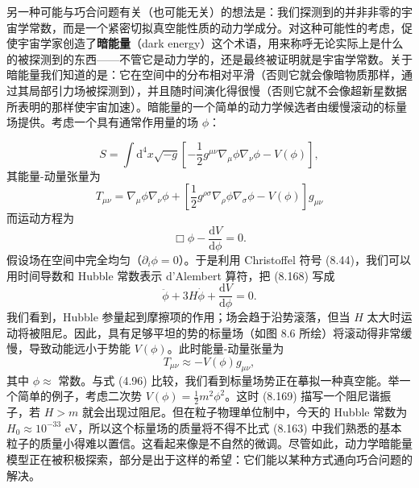 另一种可能与巧合问题有关（也可能无关）的想法是：我们探测到的并非非零的宇宙学常数，而是一个紧密切拟真空能性质的动力学成分。对这种可能性的考虑，促使宇宙学家创造了\textbf{暗能量}（dark energy）这个术语，用来称呼无论实际上是什么的被探测到的东西——不管它是动力学的，还是最终被证明就是宇宙学常数。关于暗能量我们知道的是：它在空间中的分布相对平滑（否则它就会像暗物质那样，通过其局部引力场被探测到），并且随时间演化得很慢（否则它就不会像超新星数据所表明的那样使宇宙加速）。暗能量的一个简单的动力学候选者由缓慢滚动的标量场提供。考虑一个具有通常作用量的场 $\phi$：

\begin{equation*}
S = \int \mathrm{d}^{4}x\sqrt{-g}\left[-\frac{1}{2}g^{\mu\nu}\nabla_{\mu}\phi\nabla_{\nu}\phi - V(\phi)\right],
\tag{8.166}
\end{equation*}
其能量-动量张量为
\begin{equation*}
T_{\mu\nu} = \nabla_{\mu}\phi\nabla_{\nu}\phi + \left[\frac{1}{2}g^{\rho\sigma}\nabla_{\rho}\phi\nabla_{\sigma}\phi - V(\phi)\right]g_{\mu\nu}
\tag{8.167}
\end{equation*}
而运动方程为
\begin{equation*}
\Box\phi - \frac{\mathrm{d}V}{\mathrm{d}\phi} = 0.
\tag{8.168}
\end{equation*}
假设场在空间中完全均匀（$\partial_i\phi=0$）。于是利用 Christoffel 符号 (8.44)，我们可以用时间导数和 Hubble 常数表示 d'Alembert 算符，把 (8.168) 写成
\begin{equation*}
\ddot{\phi} + 3H\dot{\phi} + \frac{\mathrm{d}V}{\mathrm{d}\phi} = 0.
\tag{8.169}
\end{equation*}
我们看到，Hubble 参量起到摩擦项的作用；场会趋于沿势滚落，但当 $H$ 太大时运动将被阻尼。因此，具有足够平坦的势的标量场（如图 8.6 所绘）将滚动得非常缓慢，导致动能远小于势能 $V(\phi)$。此时能量-动量张量为
\begin{equation*}
T_{\mu\nu} \approx -V(\phi)g_{\mu\nu},
\tag{8.170}
\end{equation*}
其中 $\phi\approx$ 常数。与式 (4.96) 比较，我们看到标量场势正在摹拟一种真空能。举一个简单的例子，考虑二次势 $V(\phi)=\frac{1}{2}m^{2}\phi^{2}$。这时 (8.169) 描写一个阻尼谐振子，若 $H>m$ 就会出现过阻尼。但在粒子物理单位制中，今天的 Hubble 常数为 $H_0\approx 10^{-33}$ eV，所以这个标量场的质量将不得不比式 (8.163) 中我们熟悉的基本粒子的质量小得难以置信。这看起来像是不自然的微调。尽管如此，动力学暗能量模型正在被积极探索，部分是出于这样的希望：它们能以某种方式通向巧合问题的解决。

